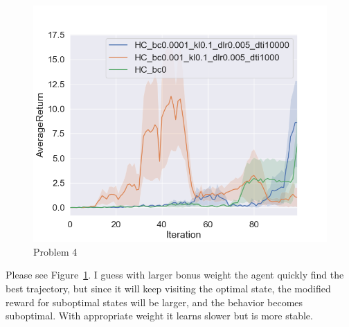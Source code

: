 \begin{figure}[htbp]
    \centering
    \includegraphics[width=0.5\linewidth]{figures/p4.png}
    \caption{Problem 4}
    \label{fig:p4}
\end{figure}

Please see Figure~\ref{fig:p4}. I guess with larger bonus weight the agent quickly find the best trajectory, but since it will keep visiting the optimal state, the modified reward for suboptimal states will be larger, and the behavior becomes suboptimal. With appropriate weight it learns slower but is more stable.